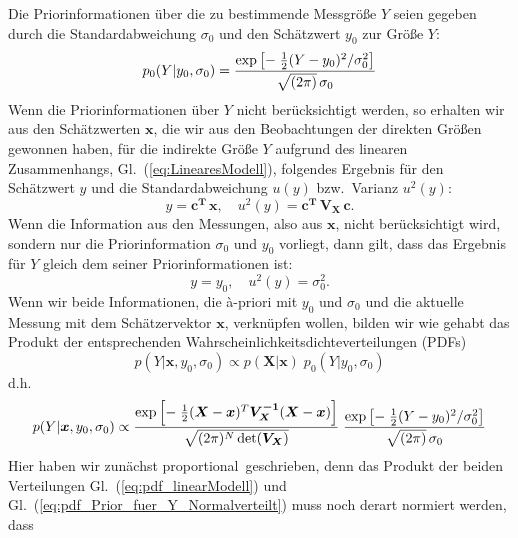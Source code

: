 Die Priorinformationen über die zu bestimmende Messgröße $Y$ seien 
gegeben durch die Standardabweichung $\sigma_0$ und den Schätzwert $y_0$ zur Größe $Y$: 
\begin{equation}
p_0(Y | y_0, \sigma_0) = \frac{\textstyle \exp \left[- \; \frac{1}{2} (Y - y_0)^2/\sigma_0^2 \right]}{\textstyle \sqrt{(2 \pi)} \, \sigma_0}
\label{eq:pdf_Prior_fuer_Y_Normalverteilt}
\end{equation}
Wenn die Priorinformationen über $Y$ nicht berücksichtigt werden, so
erhalten wir aus den Schätzwerten $\boldsymbol{x}$, die wir aus den Beobachtungen der
direkten Größen gewonnen haben, für die indirekte Größe
$Y$ aufgrund des linearen Zusammenhangs, Gl.~(\ref{eq:LinearesModell}), folgendes Ergebnis
für den Schätzwert $y$ und die Standardabweichung $u(y)$ bzw.\ Varianz $u^2(y)$:
\begin{equation}
y = \boldsymbol{c^T} \, \boldsymbol{x}, \quad 
u^2(y) = \boldsymbol{c^T} \, \boldsymbol{V_X} \, \boldsymbol{c}.
\label{eq:nurMessung}
\end{equation}
Wenn die Information aus den Messungen, also aus $\boldsymbol{x}$, nicht berücksichtigt wird,
sondern nur die Priorinformation $\sigma_0$ und $y_0$ vorliegt,
dann gilt, dass das Ergebnis für $Y$ gleich dem seiner Priorinformationen ist:
\begin{equation}
y = y_0, \quad 
u^2(y) = \sigma_0^2 .
\end{equation}
Wenn wir beide Informationen, die {\`a}-priori mit $y_0$ und $\sigma_0$ und die aktuelle
Messung mit dem Schätzervektor $\boldsymbol{x}$, verknüpfen wollen, bilden wir wie gehabt
das Produkt der entsprechenden Wahrscheinlichkeitsdichteverteilungen (PDFs)
\begin{equation}
p(Y | \boldsymbol{x}, y_0, \sigma_0) \propto 
p(\boldsymbol{X} | \boldsymbol{x}) \; p_0(Y | y_0, \sigma_0)
\end{equation}
d.h.
\begin{equation}
p(Y | \boldsymbol{x}, y_0, \sigma_0) \propto 
\frac{\textstyle \exp \left[- \; \frac{1}{2} (\boldsymbol{X} - \boldsymbol{x})^T \boldsymbol{V_X^{-1}} (\boldsymbol{X}-\boldsymbol{x}) \right]}{\textstyle \sqrt{(2 \pi)^N \operatorname{det}(\boldsymbol{V_X})}}
\; \frac{\textstyle \exp \left[- \; \frac{1}{2} (Y - y_0)^2/\sigma_0^2 \right]}{\textstyle \sqrt{(2 \pi)} \, \sigma_0}
\end{equation}
Hier haben wir zunächst \glqq proportional\grqq ~geschrieben, denn das Produkt
der beiden Verteilungen Gl.~(\ref{eq:pdf_linearModell}) und Gl.~(\ref{eq:pdf_Prior_fuer_Y_Normalverteilt}) muss noch derart normiert werden, dass
